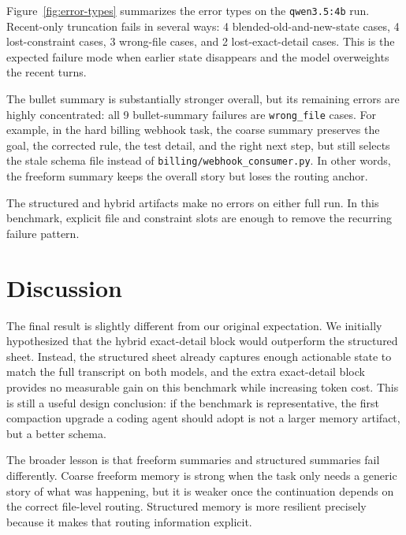 \documentclass[11pt]{article}
\begin{document}
Figure~\ref{fig:error-types} summarizes the error types on the \texttt{qwen3.5:4b} run. Recent-only truncation fails in several ways: 4 blended-old-and-new-state cases, 4 lost-constraint cases, 3 wrong-file cases, and 2 lost-exact-detail cases. This is the expected failure mode when earlier state disappears and the model overweights the recent turns.

The bullet summary is substantially stronger overall, but its remaining errors are highly concentrated: all 9 bullet-summary failures are \texttt{wrong\_file} cases. For example, in the hard billing webhook task, the coarse summary preserves the goal, the corrected rule, the test detail, and the right next step, but still selects the stale schema file instead of \texttt{billing/webhook\_consumer.py}. In other words, the freeform summary keeps the overall story but loses the routing anchor.

The structured and hybrid artifacts make no errors on either full run. In this benchmark, explicit file and constraint slots are enough to remove the recurring failure pattern.

\section{Discussion}
The final result is slightly different from our original expectation. We initially hypothesized that the hybrid exact-detail block would outperform the structured sheet. Instead, the structured sheet already captures enough actionable state to match the full transcript on both models, and the extra exact-detail block provides no measurable gain on this benchmark while increasing token cost. This is still a useful design conclusion: if the benchmark is representative, the first compaction upgrade a coding agent should adopt is not a larger memory artifact, but a better schema.

The broader lesson is that freeform summaries and structured summaries fail differently. Coarse freeform memory is strong when the task only needs a generic story of what was happening, but it is weaker once the continuation depends on the correct file-level routing. Structured memory is more resilient precisely because it makes that routing information explicit.
\end{document}
